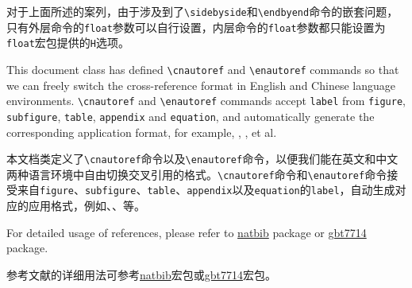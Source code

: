 \begin{ParaColumn}
    \switchcolumn
    
    对于上面所述的案列，由于涉及到了\verb"\sidebyside"和\verb"\endbyend"命令的嵌套问题，只有外层命令的\verb"float"参数可以自行设置，内层命令的\verb"float"参数都只能设置为\verb"float"宏包提供的\verb"H"选项。


    This document class has defined \verb"\cnautoref" and \verb"\enautoref" commands so that we can freely switch the cross-reference format in English and Chinese language environments.  \verb"\cnautoref" and \verb"\enautoref" commands accept \verb"label" from \verb"figure", \verb"subfigure", \verb"table", \verb"appendix" and \verb"equation", and automatically generate the corresponding application format, for example, , ,  et al.

    \switchcolumn

    本文档类定义了\verb"\cnautoref"命令以及\verb"\enautoref"命令，以便我们能在英文和中文两种语言环境中自由切换交叉引用的格式。\verb"\cnautoref"命令和\verb"\enautoref"命令接受来自\verb"figure"、\verb"subfigure"、\verb"table"、\verb"appendix"以及\verb"equation"的\verb"label"，自动生成对应的应用格式，例如、、等。


    For detailed usage of references, please refer to \href{https://www.ctan.org/pkg/natbib}{natbib} package or \href{https://www.ctan.org/pkg/gbt7714}{gbt7714} package.

    \switchcolumn

    参考文献的详细用法可参考\href{https://www.ctan.org/pkg/natbib}{natbib}宏包或\href{https://www.ctan.org/pkg/gbt7714}{gbt7714}宏包。

\end{ParaColumn}